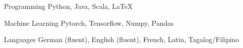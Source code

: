 

\begin{cvskills}

  \cvskill
    {Programming} %
    {Python, Java, Scala, LaTeX} %

  \cvskill
    {Machine Learning} %
    {Pytorch, Tensorflow, Numpy, Pandas} %

  \cvskill
    {Languages} %
    {German (fluent), English (fluent), French, Latin, Tagalog/Filipino} %

\end{cvskills}
